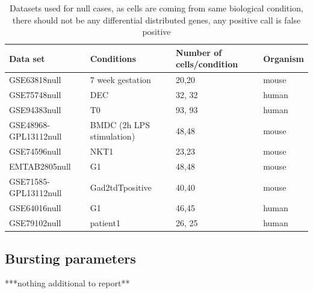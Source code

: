 \documentclass[aoas,preprint]{imsart}
\begin{document}
\begin{table}[h!]
\footnotesize
\centering
\begin{tabular}{ |p{3cm}|p{5cm}|p{3cm}|p{2cm}|}
\hline
 Data set & Conditions & Number of cells/condition & Organism \\
\hline
\hline
GSE63818null & 7 week gestation  & 20,20 &mouse \\
\hline
GSE75748null & DEC & 32, 32 & human\\
\hline
GSE94383null & T0 & 93, 93 & human \\
\hline
GSE48968-GPL13112null & BMDC (2h LPS stimulation) & 48,48 & mouse \\
 \hline
 GSE74596null & NKT1 & 23,23 & mouse\\
 \hline
 EMTAB2805null & G1 & 48,48 & mouse\\
 \hline
GSE71585-GPL13112null &Gad2tdTpositive  & 40,40 & mouse \\
\hline
GSE64016null & G1 & 46,45 & human \\
\hline
GSE79102null & patient1 & 26, 25 & human\\
\hline
\end{tabular}
\caption{Datasets used for null cases, as cells are coming from same biological condition, there should not be any differential distributed genes, any positive call is false positive}
\label{table:2}
\end{table}

\clearpage


\subsection{Bursting parameters}

***nothing additional to report**


\end{document}
